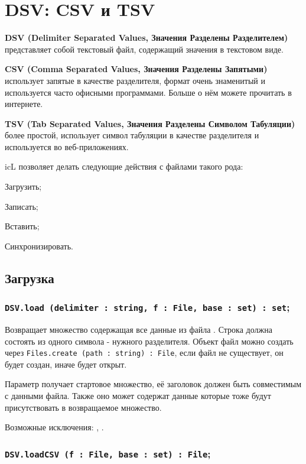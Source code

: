 \section{DSV: CSV и TSV}

{\bf DSV (Delimiter Separated Values, Значения Разделены Разделителем)} представляет собой текстовый файл, содержащий значения в текстовом виде.

{\bf CSV (Comma Separated Values, Значения Разделены Запятыми)} использует запятые в качестве разделителя, формат очень знаменитый и используется часто офисными программами. Больше о нём можете прочитать в интернете.

{\bf TSV (Tab Separated Values, Значения Разделены Символом Табуляции)} более простой, использует символ табуляции в качестве разделителя и используется во веб-приложениях.

icL позволяет делать следующие действия с файлами такого рода:
\begin{icItems}
	\item Загрузить;
	\item Записать;
	\item Вставить;
	\item Синхронизировать.
\end{icItems}

\subsection{Загрузка}

\subsubsection{\lstinline|DSV.load (delimiter : string, f : File, base : set) : set|;}

Возвращает множество содержащая все данные из файла . Строка  должна состоять из одного символа - нужного разделителя. Объект файл можно создать через \lstinline|Files.create (path : string) : File|, если файл не существует, он будет создан, иначе будет открыт.

Параметр  получает стартовое множество, её заголовок должен быть совместимым с данными файла. Также оно может содержат данные которые тоже будут присутствовать в возвращаемое множество. 

Возможные исключения: , .

\subsubsection{\lstinline|DSV.loadCSV (f : File, base : set) : File|;}

